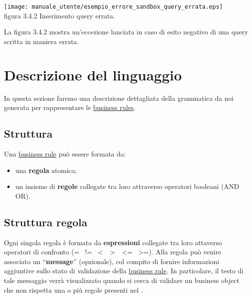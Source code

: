 \begin{center}
\texttt{[image: manuale\_utente/esempio\_errore\_sandbox\_query\_errata.eps]}\\
figura 3.4.2 Inserimento query errata.
\end{center}
La figura 3.4.2 mostra un'eccezione lanciata in caso di esito negativo di una query scritta in maniera errata.


\chapter{Descrizione del linguaggio}
In questa sezione faremo una descrizione dettagliata della grammatica da noi generata per rappresentare le \underline{business rules}. 
\section{Struttura \br}
Una \underline{business rule} pu\`o essere formata da:
\begin{itemize}
\item una \textbf{regola} atomica;
\item un insieme di \textbf{regole} collegate tra loro attraverso operatori booleani (AND \textbar OR).
\end{itemize}
\section{Struttura regola}
Ogni singola regola \`e formata da \textbf{espressioni} collegate tra loro attaverso operatori di confronto (= \textbar\ != \textbar\ \textless\ \textbar\ \textgreater\ \textbar\ \textless= \textbar\ \textgreater=). Alla regola pu\`o venire associato un ``\textbf{message}'' (opzionale), col compito di fornire informazioni aggiuntive sullo stato di validazione della \underline{business rule}. In particolare, il testo di tale messaggio verr\`a visualizzato quando si cerca di validare un business object che non rispetta una o pi\`u regole presenti nel \rp.
